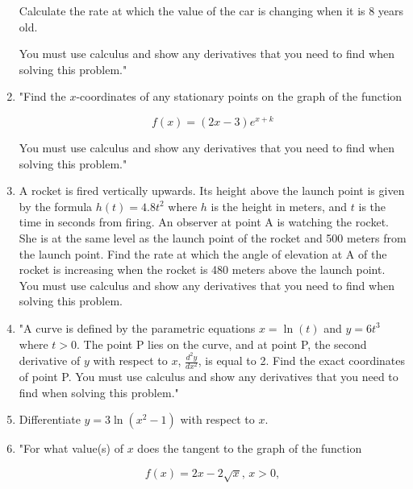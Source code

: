 \documentclass{article}
\begin{document}
\begin{enumerate}
Calculate the rate at which the value of the car is changing when it is 8 years old.

You must use calculus and show any derivatives that you need to find when solving this problem."
\vspace{3cm}
\item "Find the \( x \)-coordinates of any stationary points on the graph of the function

\[ f(x) = (2x - 3)e^{x+k} \]

You must use calculus and show any derivatives that you need to find when solving this problem."
\vspace{3cm}
\item A rocket is fired vertically upwards. Its height above the launch point is given by the formula \( h(t) = 4.8t^2 \) where \( h \) is the height in meters, and \( t \) is the time in seconds from firing. An observer at point A is watching the rocket. She is at the same level as the launch point of the rocket and 500 meters from the launch point. Find the rate at which the angle of elevation at A of the rocket is increasing when the rocket is 480 meters above the launch point. You must use calculus and show any derivatives that you need to find when solving this problem.
\vspace{3cm}
\item "A curve is defined by the parametric equations \( x = \ln(t) \) and \( y = 6t^3 \) where \( t > 0 \). The point P lies on the curve, and at point P, the second derivative of \( y \) with respect to \( x \), \( \frac{d^2 y}{dx^2} \), is equal to 2. Find the exact coordinates of point P. You must use calculus and show any derivatives that you need to find when solving this problem."
\vspace{3cm}
\item Differentiate \( y = 3\ln(x^2 - 1) \) with respect to \( x \).
\vspace{3cm}
\item "For what value(s) of \( x \) does the tangent to the graph of the function

\[ f(x) = 2x - 2\sqrt{x}, \, x > 0, \]


\end{enumerate}
\end{document}
